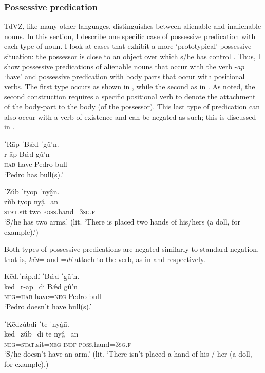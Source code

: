 \documentclass[output=paper,colorlinks=true, citecolor=brown]{langscibook}
\begin{document}
\subsubsection{Possessive predication}\label{sec:zap:2.3.3}

TdVZ, like many other languages, distinguishes between alienable and inalienable nouns. In this section, I describe one specific case of possessive predication with each type of noun. I look at cases that exhibit a more ‘prototypical’ possessive situation: the possessor is close to an object over which s/he has control \citep{Stassen2009}. Thus, I show possessive predications of alienable nouns that occur with the verb -\textit{āp} ‘have’ and possessive predication with body parts that occur with positional verbs. The first type occurs as shown in , while the second as in . As noted, the second construction requires a specific positional verb to denote the attachment of the body{}-part to the body (of the possessor). This last type of predication can also occur with a verb of existence and can be negated as such; this is discussed in .

\ea\label{ex:zap:41} 
    \glll ˈRāp ˈBǽd ˈgû’n.\\ 
          r-āp Bǽd gû’n\\
          \textsc{hab}{}-have Pedro bull \\
        \glt ‘Pedro has bull(s).’
\z 

\ea\label{ex:zap:42} 
    \glll ˈZǔb ˈtyōp ˈnyâ̰n̄. \\ 
          zǔb tyōp nyâ̰=ān\\
          \textsc{stat.}sit two \textsc{poss}.hand=\textsc{3sg.f}\\
    \glt  ‘S/he has two arms.’ (lit. ‘There is placed two hands of his/hers (a doll, for example).’)
\z 


Both types of possessive predications are negated similarly to standard negation, that is, \textit{kēd}= and =\textit{di} attach to the verb, as in  and  respectively.

\ea\label{ex:zap:43} 
    \glll Kēd.ˈráp.dí ˈBǽd ˈgû’n.\\ 
            kēd=r-āp=di Bǽd gû’n\\
           \textsc{neg}=\textsc{hab}{}-have=\textsc{neg} Pedro bull\\
    \glt  ‘Pedro doesn’t have bull(s).’
\z 

\ea\label{ex:zap:44} 
    \glll ˈKēdzǔbdi ˈte ˈnyâ̰n̄. \\ 
           kēd=zǔb=di te nyâ̰=ān\\
          \textsc{neg}=\textsc{stat.}sit=\textsc{neg} \textsc{indf} \textsc{poss}.hand=\textsc{3sg.f} \\
    \glt ‘S/he doesn’t have an arm.’ (lit. ‘There isn’t placed a hand of his / her (a doll, for example).)
\z 
\end{document}
